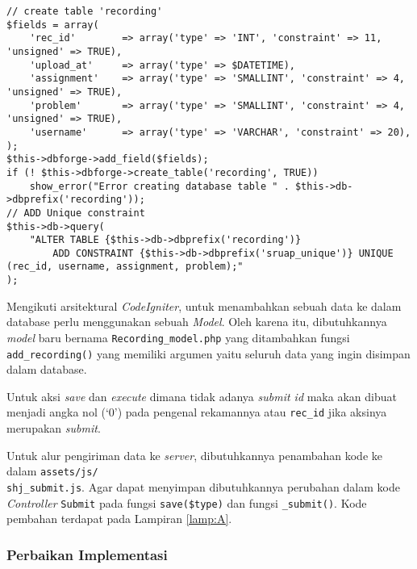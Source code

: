 \begin{enumerate}
    \begin{lstlisting}[caption={Kode membuat database pada SharIF-Judge}, label={kode:5:2:adddatabasetable}]
// create table 'recording'
$fields = array(
    'rec_id' 	    => array('type' => 'INT', 'constraint' => 11, 'unsigned' => TRUE),	
    'upload_at'		=> array('type' => $DATETIME),
    'assignment' 	=> array('type' => 'SMALLINT', 'constraint' => 4, 'unsigned' => TRUE),
    'problem'       => array('type' => 'SMALLINT', 'constraint' => 4, 'unsigned' => TRUE),
    'username'      => array('type' => 'VARCHAR', 'constraint' => 20),
);
$this->dbforge->add_field($fields);
if (! $this->dbforge->create_table('recording', TRUE))
    show_error("Error creating database table " . $this->db->dbprefix('recording'));
// ADD Unique constraint
$this->db->query(
    "ALTER TABLE {$this->db->dbprefix('recording')}
        ADD CONSTRAINT {$this->db->dbprefix('sruap_unique')} UNIQUE (rec_id, username, assignment, problem);"
);
    \end{lstlisting}

    Mengikuti arsitektural \textit{CodeIgniter}, untuk menambahkan sebuah data ke dalam database perlu menggunakan sebuah \textit{Model}. Oleh karena itu, dibutuhkannya \textit{model} baru bernama \verb|Recording_model.php| yang ditambahkan fungsi \verb|add_recording()| yang memiliki argumen yaitu seluruh data yang ingin disimpan dalam database.

    Untuk aksi \textit{save} dan \textit{execute} dimana tidak adanya \textit{submit id} maka akan dibuat menjadi angka nol (`0') pada pengenal rekamannya atau \verb|rec_id| jika aksinya merupakan \textit{submit}.
\end{enumerate}

Untuk alur pengiriman data ke \textit{server}, dibutuhkannya penambahan kode ke dalam \verb|assets/js/|\\\verb|shj_submit.js|. Agar dapat menyimpan dibutuhkannya perubahan dalam kode \textit{Controller} \verb|Submit| pada fungsi \verb|save($type)| dan fungsi \verb|_submit()|. Kode pembahan terdapat pada Lampiran \ref{lamp:A}.

\subsubsection{Perbaikan Implementasi}

